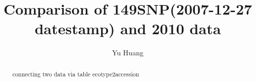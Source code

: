 \documentclass[a3paper,10pt]{article}
\title{Comparison of 149SNP(2007-12-27 datestamp) and 2010 data}
\author{Yu Huang}
\begin{document}
\maketitle

\begin{abstract}
connecting two data via table ecotype2accession
\end{abstract}

\tableofcontents




\end{document}
